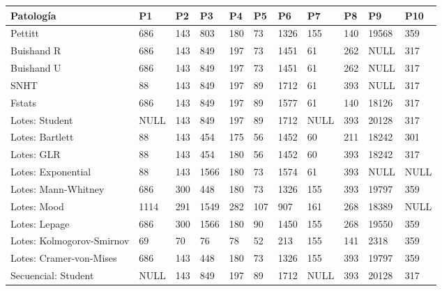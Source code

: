 \documentclass[runningheads,a4paper,12pt]{report}
\begin{document}
\begin{table}[H]
\begin{turn}{90}
\begin{tabular}{|l|l|l|l|l|l|l|l|l|l|l|}
\hline
Patología                      & P1   & P2   & P3   & P4   & P5  & P6   & P7   & P8  & P9    & P10  \\ \hline
Pettitt                        & 686  & 143  & 803  & 180  & 73  & 1326 & 155  & 140 & 19568 & 359  \\ \hline
Buishand R                     & 686  & 143  & 849  & 197  & 73  & 1451 & 61   & 262 & NULL  & 317  \\ \hline
Buishand U                     & 686  & 143  & 849  & 197  & 73  & 1451 & 61   & 262 & NULL  & 317  \\ \hline
SNHT                           & 88   & 143  & 849  & 197  & 89  & 1712 & 61   & 393 & NULL  & 317  \\ \hline
Fstats                         & 686  & 143  & 849  & 197  & 89  & 1577 & 61   & 140 & 18126 & 317  \\ \hline
Lotes: Student                 & NULL & 143  & 849  & 197  & 89  & 1712 & NULL & 393 & 20128 & 317  \\ \hline
Lotes: Bartlett                & 88   & 143  & 454  & 175  & 56  & 1452 & 60   & 211 & 18242 & 301  \\ \hline
Lotes: GLR                     & 88   & 143  & 454  & 180  & 56  & 1452 & 60   & 393 & 18242 & 317  \\ \hline
Lotes: Exponential             & 88   & 143  & 1566 & 180  & 73  & 1574 & 61   & 393 & NULL  & NULL \\ \hline
Lotes: Mann-Whitney            & 686  & 300  & 448  & 180  & 73  & 1326 & 155  & 393 & 19797 & 359  \\ \hline
Lotes: Mood                    & 1114 & 291  & 1549 & 282  & 107 & 907  & 161  & 268 & 18389 & NULL \\ \hline
Lotes: Lepage                  & 686  & 300  & 1566 & 180  & 90  & 1450 & 155  & 268 & 19550 & 359  \\ \hline
Lotes: Kolmogorov-Smirnov      & 69   & 70   & 76   & 78   & 52  & 213  & 155  & 141 & 2318  & 359  \\ \hline
Lotes: Cramer-von-Mises        & 686  & 143  & 448  & 180  & 73  & 1326 & 155  & 393 & 19797 & 359  \\ \hline
Secuencial: Student            & NULL & 143  & 849  & 197  & 89  & 1712 & NULL & 393 & 20128 & 317  \\ \hline

\end{tabular}
\end{turn}
\end{table}
\end{document}
